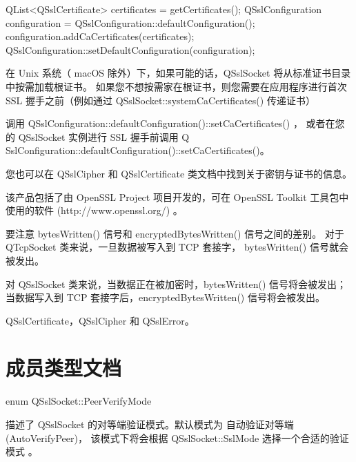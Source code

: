 \begin{cppcode}
 QList<QSslCertificate> certificates = getCertificates();
 QSslConfiguration configuration = QSslConfiguration::defaultConfiguration();
 configuration.addCaCertificates(certificates);
 QSslConfiguration::setDefaultConfiguration(configuration);
\end{cppcode}


\begin{notice}
在 Unix 系统（ macOS 除外）下，如果可能的话，QSslSocket 将从标准证书目录中按需加载根证书。
如果您不想按需家在根证书，则您需要在应用程序进行首次 SSL 握手之前（例如通过 QSslSocket::systemCaCertificates() 传递证书）

调用 QSslConfiguration::defaultConfiguration()::setCaCertificates() ，
或者在您的 QSslSocket 实例进行 SSL 握手前调用 Q
SslConfiguration::defaultConfiguration()::setCaCertificates()。
\end{notice}

您也可以在 QSslCipher 和 QSslCertificate 类文档中找到关于密钥与证书的信息。

该产品包括了由 OpenSSL Project 项目开发的，可在 OpenSSL Toolkit 工具包中使用的软件 (http://www.openssl.org/) 。

\begin{notice}
要注意 bytesWritten() 信号和 encryptedBytesWritten() 信号之间的差别。 
对于 QTcpSocket 类来说，一旦数据被写入到 TCP 套接字， bytesWritten() 信号就会被发出。 

对 QSslSocket 类来说，当数据正在被加密时，bytesWritten() 信号将会被发出；
当数据写入到 TCP 套接字后，encryptedBytesWritten() 信号将会被发出。
\end{notice}

\begin{seeAlso}
QSslCertificate，QSslCipher 和 QSslError。
\end{seeAlso}



\section{成员类型文档}

enum QSslSocket::PeerVerifyMode

描述了 QSslSocket 的对等端验证模式。默认模式为 自动验证对等端 (AutoVerifyPeer)，
该模式下将会根据 QSslSocket::SslMode 选择一个合适的验证模式 。

